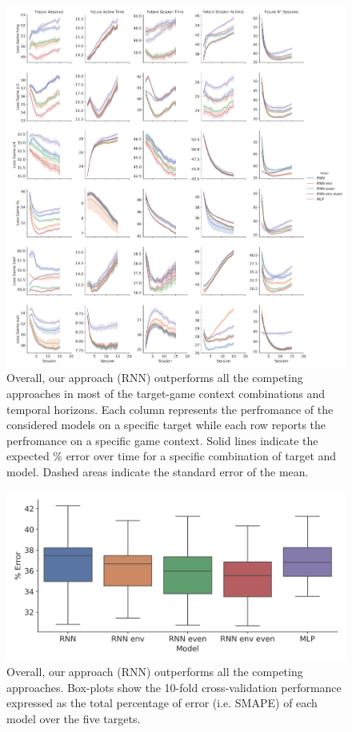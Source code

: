 \lorem
\begin{figure}[h]
\centering
\includegraphics[height=0.5\textheight,keepaspectratio]{images/chapter_3/models_comparison_non_collapsed_33.png}
\caption[\textbf{Model comparison without collapsing}]{ Overall, our approach (RNN) outperforms all the competing approaches in most of the target-game context combinations and temporal horizons. Each column represents the perfromance of the considered models on a specific target while each row reports the perfromance on a specific game context. Solid lines indicate the expected \% error over time for a specific combination of target and model. Dashed areas indicate the standard error of the mean.}
\label{model_comp_non_coll_33} 
\end{figure}
\lorem
\begin{figure}[h]
\centering
\includegraphics[width=.5\columnwidth]{images/chapter_3/performance_collapsed_33.png}
\caption[\textbf{Aggregated comparison of model performance}]{ Overall, our approach (RNN) outperforms all the competing approaches. Box-plots show the 10-fold cross-validation performance expressed as the total percentage of error (i.e. SMAPE) of each model over the five targets.}
\label{model_comp_coll_33} 
\end{figure}
